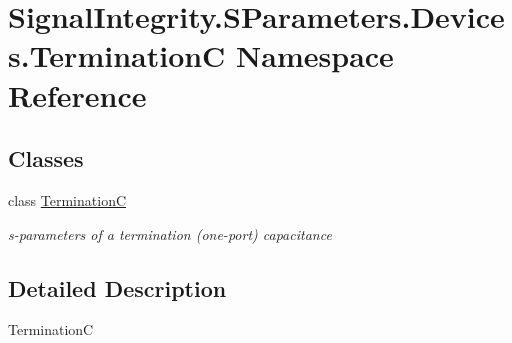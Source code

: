 \hypertarget{namespaceSignalIntegrity_1_1SParameters_1_1Devices_1_1TerminationC}{}\section{Signal\+Integrity.\+S\+Parameters.\+Devices.\+TerminationC Namespace Reference}
\label{namespaceSignalIntegrity_1_1SParameters_1_1Devices_1_1TerminationC}
\subsection*{Classes}
\begin{DoxyCompactItemize}
\item 
class \hyperlink{classSignalIntegrity_1_1SParameters_1_1Devices_1_1TerminationC_1_1TerminationC}{TerminationC}
\begin{DoxyCompactList}\small\item\em s-\/parameters of a termination (one-\/port) capacitance \end{DoxyCompactList}\end{DoxyCompactItemize}


\subsection{Detailed Description}
\begin{DoxyVerb}TerminationC\end{DoxyVerb}
 